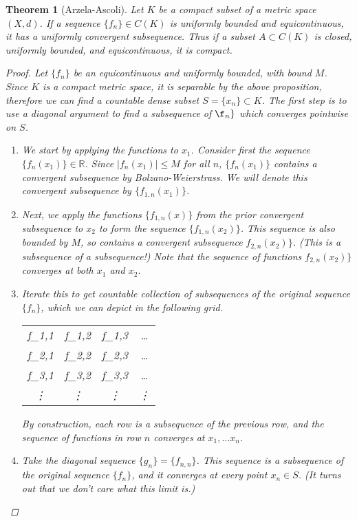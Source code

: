 \documentclass[10pt]{article}         %
\newtheorem{theorem}{Theorem}[section]
\theoremstyle{remark}
\newcommand{\R}{\mathbb{R}}
\begin{document}
\begin{theorem}[Arzela-Ascoli] Let $K$ be a compact subset of a metric space $(X, d)$. If a sequence $\{f_n\} \in C(K)$ is uniformly bounded and equicontinuous, it has a uniformly convergent subsequence. Thus if a subset $A \subset C(K)$ is closed, uniformly bounded, and equicontinuous, it is compact.
\begin{proof}
Let $\{f_n\}$ be an equicontinuous and uniformly bounded, with bound $M$. Since $K$ is a compact metric space, it is separable by the above proposition, therefore we can find a countable dense subset $S = \{ x_n \} \subset K$. The first step is to use a diagonal argument to find a subsequence of $\f_n\}$ which converges pointwise on $S$. 
\begin{enumerate}
    \item We start by applying the functions to $x_1$. Consider first the sequence $\{ f_n(x_1) \} \in \R$. Since $|f_n(x_1)| \leq M$ for all $n$, $\{ f_n(x_1) \}$ contains a convergent subsequence by Bolzano-Weierstrass. We will denote this convergent subsequence by $\{ f_{1,n}(x_1) \}$.
    \item Next, we apply the functions $\{ f_{1,n}(x) \}$ from the prior convergent subsequence to $x_2$ to form the sequence $\{ f_{1,n}(x_2) \}$. This sequence is also bounded by $M$, so contains a convergent subsequence $f_{2,n}(x_2) \}$. (This is a subsequence of a subsequence!) Note that the sequence of functions $f_{2,n}(x_2) \}$ converges at both $x_1$ and $x_2$.
    \item Iterate this to get countable collection of subsequences of the original sequence $\{f_n\}$, which we can depict in the following grid.
    \begin{table}[H]
        \centering
        \begin{tabular}{cccc}
             f_{1,1} & f_{1,2} & f_{1,3} & \dots  \\
             f_{2,1} & f_{2,2} & f_{2,3} & \dots  \\
             f_{3,1} & f_{3,2} & f_{3,3} & \dots  \\
             \vdots & \vdots & \vdots & \vdots
        \end{tabular}
    \end{table}
    By construction, each row is a subsequence of the previous row, and the sequence of functions in row $n$ converges at $x_1, \dots x_n$.
    \item Take the diagonal sequence $\{ g_n\} = \{ f_{n,n} \}$. This sequence is a subsequence of the original sequence $\{f_n\}$, and it converges at every point $x_n \in S$. (It turns out that we don't care what this limit is.)

\end{enumerate}
\end{proof}
\end{theorem}
\end{document}
